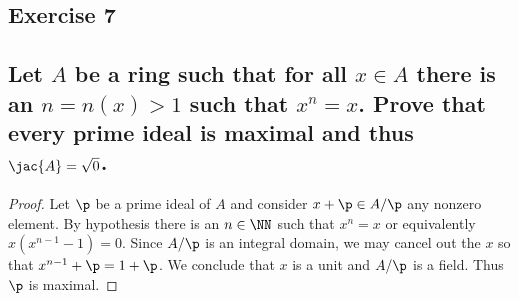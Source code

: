 \subsection*{Exercise 7}
\subsection*{%
Let $A$ be a ring such that for all $x\in A$ there is an $n=n(x)>1$ such that
$x^n=x$. Prove that every prime ideal is maximal and thus $\jac{A}=\sqrt{0}$.
} 

\begin{proof}%
Let $\p$ be a prime ideal of $A$ and consider $x+\p\in A/\p$ any nonzero element.
By hypothesis there is an $n\in\NN$ such that $x^n=x$ or equivalently $x(x^{n-1}-1)=0$.
Since $A/\p$ is an integral domain, we may cancel out the $x$ so that $x^{n-1}+\p=1+\p$.
We conclude that $x$ is a unit and $A/\p$ is a field. Thus $\p$ is maximal. 
%
\end{proof}%

